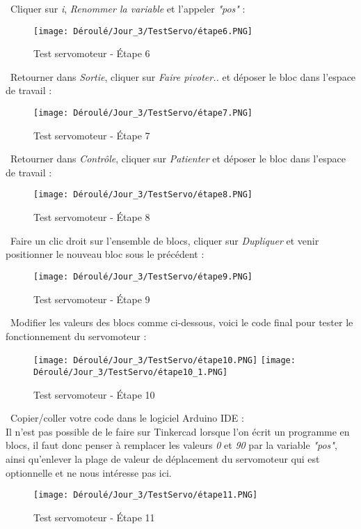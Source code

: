 \begin{flushleft}
\textbullet \, Cliquer sur \textit{i}, \textit{Renommer la variable} et l'appeler \textit{"pos"} :
\begin{figure}[!h]
    \centering
    \texttt{[image: Déroulé/Jour\_3/TestServo/étape6.PNG]}
    \caption[\'Etape 6]{Test servomoteur - \'Etape 6}
    \label{fig:my_label}
\end{figure}

\textbullet \, Retourner dans \textit{Sortie}, cliquer sur \textit{Faire pivoter..} et déposer le bloc dans l'espace de travail :
\begin{figure}[!h]
    \centering
    \texttt{[image: Déroulé/Jour\_3/TestServo/étape7.PNG]}
    \caption[\'Etape 7]{Test servomoteur - \'Etape 7}
    \label{fig:my_label}
\end{figure}

\textbullet \, Retourner dans \textit{Contrôle}, cliquer sur \textit{Patienter} et déposer le bloc dans l'espace de travail :
\begin{figure}[!h]
    \centering
    \texttt{[image: Déroulé/Jour\_3/TestServo/étape8.PNG]}
    \caption[\'Etape 8]{Test servomoteur - \'Etape 8}
    \label{fig:my_label}
\end{figure}

\newpage

\textbullet \, Faire un clic droit sur l'ensemble de blocs, cliquer sur \textit{Dupliquer} et venir positionner le nouveau bloc sous le précédent :
\begin{figure}[!h]
    \centering
    \texttt{[image: Déroulé/Jour\_3/TestServo/étape9.PNG]}
    \caption[\'Etape 9]{Test servomoteur - \'Etape 9}
    \label{fig:my_label}
\end{figure}

\textbullet \, Modifier les valeurs des blocs comme ci-dessous, voici le code final pour tester le fonctionnement du servomoteur :
\begin{figure}[!h]
    \centering
    \texttt{[image: Déroulé/Jour\_3/TestServo/étape10.PNG]}
    \texttt{[image: Déroulé/Jour\_3/TestServo/étape10\_1.PNG]}
    \caption[\'Etape 10]{Test servomoteur - \'Etape 10}
    \label{fig:my_label}
\end{figure}

\newpage

\textbullet \, Copier/coller votre code dans le logiciel Arduino IDE :\\
Il n'est pas possible de le faire sur Tinkercad lorsque l'on écrit un programme en blocs, il faut donc penser à remplacer les valeurs \textit{0} et \textit{90} par la variable \textit{"pos"}, ainsi qu'enlever la plage de valeur de déplacement du servomoteur qui est optionnelle et ne nous intéresse pas ici.
\begin{figure}[!h]
    \centering
    \texttt{[image: Déroulé/Jour\_3/TestServo/étape11.PNG]}
    \caption[\'Etape 11]{Test servomoteur - \'Etape 11}
    \label{fig:my_label}
\end{figure}


\end{flushleft}
